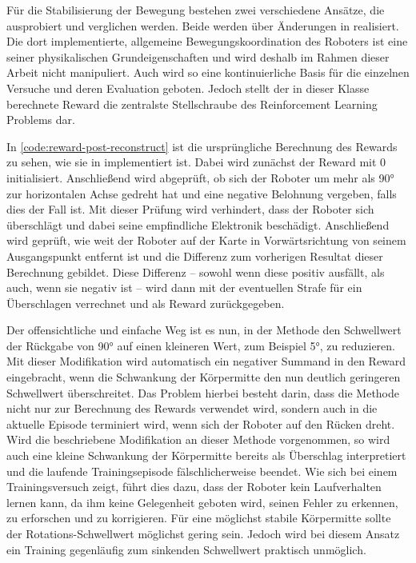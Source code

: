 Für die Stabilisierung der Bewegung bestehen zwei verschiedene Ansätze, die ausprobiert und verglichen werden.
Beide werden über Änderungen in  realisiert.
Die dort implementierte, allgemeine Bewegungskoordination des Roboters ist eine seiner physikalischen Grundeigenschaften und wird deshalb im Rahmen dieser Arbeit nicht manipuliert.
Auch wird so eine kontinuierliche Basis für die einzelnen Versuche und deren Evaluation geboten.
Jedoch stellt der in dieser Klasse berechnete Reward die zentralste Stellschraube des Reinforcement Learning Problems dar.

\begin{figure}
    
\end{figure}

In \autoref{code:reward-post-reconstruct} ist die ursprüngliche Berechnung des Rewards zu sehen, wie sie in  implementiert ist.
Dabei wird zunächst der Reward mit 0 initialisiert.
Anschließend wird abgeprüft, ob sich der Roboter um mehr als 90° zur horizontalen Achse gedreht hat und eine negative Belohnung vergeben, falls dies der Fall ist.
Mit dieser Prüfung wird verhindert, dass der Roboter sich überschlägt und dabei seine empfindliche Elektronik beschädigt.
Anschließend wird geprüft, wie weit der Roboter auf der Karte in Vorwärtsrichtung von seinem Ausgangspunkt entfernt ist und die Differenz zum vorherigen Resultat dieser Berechnung gebildet.
Diese Differenz -- sowohl wenn diese positiv ausfällt, als auch, wenn sie negativ ist -- wird dann mit der eventuellen Strafe für ein Überschlagen verrechnet und als Reward zurückgegeben.

Der offensichtliche und einfache Weg ist es nun, in der Methode  den Schwellwert der Rückgabe von 90° auf einen kleineren Wert, zum Beispiel 5°, zu reduzieren.
Mit dieser Modifikation wird automatisch ein negativer Summand in den Reward eingebracht, wenn die Schwankung der Körpermitte den nun deutlich geringeren Schwellwert überschreitet.
Das Problem hierbei besteht darin, dass die Methode  nicht nur zur Berechnung des Rewards verwendet wird, sondern auch in  die aktuelle Episode terminiert wird, wenn sich der Roboter auf den Rücken dreht.
Wird die beschriebene Modifikation an dieser Methode vorgenommen, so wird auch eine kleine Schwankung der Körpermitte bereits als Überschlag interpretiert und die laufende Trainingsepisode fälschlicherweise beendet.
Wie sich bei einem Trainingsversuch zeigt, führt dies dazu, dass der Roboter kein Laufverhalten lernen kann, da ihm keine Gelegenheit geboten wird, seinen Fehler zu erkennen, zu erforschen und zu korrigieren.
Für eine möglichst stabile Körpermitte sollte der Rotations-Schwellwert möglichst gering sein.
Jedoch wird bei diesem Ansatz ein Training gegenläufig zum sinkenden Schwellwert praktisch unmöglich.

